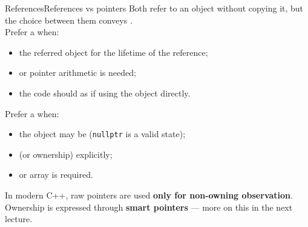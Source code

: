 \begin{frame}{References}{References vs pointers}
	\justifying
	Both refer to an object without copying it, but the choice between them conveys .\\
	Prefer a  when:
	\begin{itemize}
		\item the referred object  for the lifetime of the reference;
		\item {} or pointer arithmetic is needed;
		\item the code should  as if using the object directly.
	\end{itemize}
	\medskip
	Prefer a  when:
	\begin{itemize}
		\item the object may be  (\texttt{nullptr} is a valid state);
		\item {} (or ownership)  explicitly;
		\item {} or array  is required.
	\end{itemize}
	\begin{block}{}
		\centering
		In modern C++, raw pointers are used \textbf{only for non-owning observation}.\\
		Ownership is expressed through \textbf{smart pointers} — more on this in the next lecture.
	\end{block}
\end{frame}
